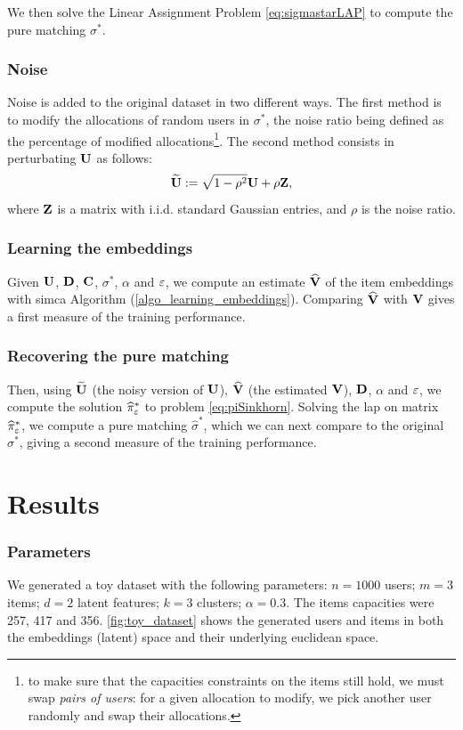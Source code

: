 We then solve the Linear Assignment Problem \eqref{eq:sigmastarLAP} to compute
the pure matching $\sigma^*$.

\subsubsection*{Noise}
Noise is added to the original dataset in two different ways. The first method
is to modify the allocations of random users in $\sigma^*$, the noise ratio
being defined as the percentage of modified allocations\footnote{to make sure
    that the capacities constraints on the items still hold, we must swap
    \emph{pairs of users}: for a given allocation to modify, we pick another user
    randomly and swap their allocations.}. The second method consists in
perturbating $\mathbf{U}$ as follows:
\begin{equation*}
    \widetilde{\mathbf{U}} := \sqrt{1-\rho^2} \mathbf{U} + \rho \mathbf{Z},
\end{equation*} where $\mathbf{Z}$ is a matrix with i.i.d. standard Gaussian entries, and $\rho$ is the noise ratio.

\subsubsection*{Learning the embeddings}
Given $\mathbf{U}$, $\mathbf{D}$, $\mathbf{C}$, $\sigma^*$, $\alpha$ and $\varepsilon$, we compute an
estimate $\widehat{\mathbf{V}}$ of the item embeddings with \ac{simca} Algorithm
(\cref{algo_learning_embeddings}). Comparing $\widehat{\mathbf{V}}$ with $\mathbf{V}$ gives a
first measure of the training performance.

\subsubsection*{Recovering the pure matching}
Then, using $\widetilde{\mathbf{U}}$ (the noisy version of $\mathbf{U}$), $\widehat{\mathbf{V}}$ (the
estimated $\mathbf{V}$), $\mathbf{D}$, $\alpha$ and $\varepsilon$, we compute the solution
$\widehat{\pi}^*_{\varepsilon}$ to problem \eqref{eq:piSinkhorn}. Solving the \ac{lap}
on matrix $\widehat{\pi}^*_{\varepsilon}$, we compute a pure matching
$\widehat{\sigma}^*$, which we can next compare to the original ${\sigma}^*$,
giving a second measure of the training performance.

\section{Results}

\subsubsection*{Parameters}
We generated a toy dataset with the following parameters: $n=1000$ users; $m=3$
items; $d=2$ latent features; $k=3$ clusters; $\alpha=0.3$. The items capacities
were 257, 417 and 356. \cref{fig:toy_dataset} shows the generated users and
items in both the embeddings (latent) space and their underlying euclidean
space.

